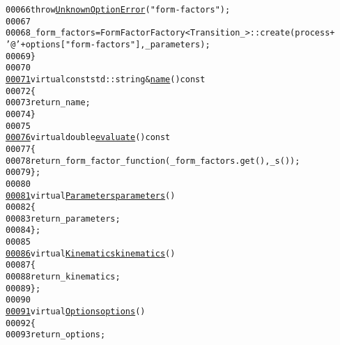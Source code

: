 \begin{footnotesize}
\begin{alltt}
00066                     \textcolor{keywordflow}{throw} \hyperlink{structeos_1_1UnknownOptionError}{UnknownOptionError}(\textcolor{stringliteral}{"form-factors"});
00067 
00068                 \_form\_factors = FormFactorFactory<Transition\_>::create(process + 
      \textcolor{charliteral}{'@'} + options[\textcolor{stringliteral}{"form-factors"}], \_parameters);
00069             \}
00070 
\hypertarget{form-factor-adapter_8hh_source_l00071}{}\hyperlink{classeos_1_1FormFactorAdapter_ad4b0b6158fcbbdafeae6d62a2326ac92}{00071}             \textcolor{keyword}{virtual} \textcolor{keyword}{const} std::string & \hyperlink{classeos_1_1FormFactorAdapter_ad4b0b6158fcbbdafeae6d62a2326ac92}{name}()\textcolor{keyword}{ const}
00072 \textcolor{keyword}{            }\{
00073                 \textcolor{keywordflow}{return} \_name;
00074             \}
00075 
\hypertarget{form-factor-adapter_8hh_source_l00076}{}\hyperlink{classeos_1_1FormFactorAdapter_ad14dd267ae5fcbe9b739d438904ce959}{00076}             \textcolor{keyword}{virtual} \textcolor{keywordtype}{double} \hyperlink{classeos_1_1FormFactorAdapter_ad14dd267ae5fcbe9b739d438904ce959}{evaluate}()\textcolor{keyword}{ const}
00077 \textcolor{keyword}{            }\{
00078                 \textcolor{keywordflow}{return} \_form\_factor\_function(\_form\_factors.get(), \_s());
00079             \};
00080 
\hypertarget{form-factor-adapter_8hh_source_l00081}{}\hyperlink{classeos_1_1FormFactorAdapter_aa1505da65e397bdda2e59ecfd49e375d}{00081}             \textcolor{keyword}{virtual} \hyperlink{classeos_1_1Parameters}{Parameters} \hyperlink{classeos_1_1FormFactorAdapter_aa1505da65e397bdda2e59ecfd49e375d}{parameters}()
00082             \{
00083                 \textcolor{keywordflow}{return} \_parameters;
00084             \};
00085 
\hypertarget{form-factor-adapter_8hh_source_l00086}{}\hyperlink{classeos_1_1FormFactorAdapter_ae4fc137cd1c8b5703ffd6986e9ce739b}{00086}             \textcolor{keyword}{virtual} \hyperlink{classeos_1_1Kinematics}{Kinematics} \hyperlink{classeos_1_1FormFactorAdapter_ae4fc137cd1c8b5703ffd6986e9ce739b}{kinematics}()
00087             \{
00088                 \textcolor{keywordflow}{return} \_kinematics;
00089             \};
00090 
\hypertarget{form-factor-adapter_8hh_source_l00091}{}\hyperlink{classeos_1_1FormFactorAdapter_a758693e9a8fff947fe1500796f1bda4e}{00091}             \textcolor{keyword}{virtual} \hyperlink{classeos_1_1Options}{Options} \hyperlink{classeos_1_1FormFactorAdapter_a758693e9a8fff947fe1500796f1bda4e}{options}()
00092             \{
00093                 \textcolor{keywordflow}{return} \_options;

\end{alltt}
\end{footnotesize}
